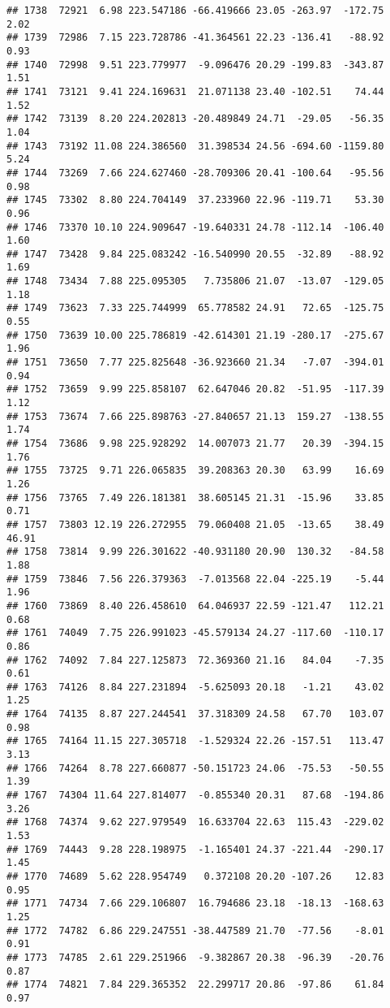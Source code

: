 \documentclass[]{article}
\begin{document}
\begin{verbatim}
## 1738  72921  6.98 223.547186 -66.419666 23.05 -263.97  -172.75  2.02
## 1739  72986  7.15 223.728786 -41.364561 22.23 -136.41   -88.92  0.93
## 1740  72998  9.51 223.779977  -9.096476 20.29 -199.83  -343.87  1.51
## 1741  73121  9.41 224.169631  21.071138 23.40 -102.51    74.44  1.52
## 1742  73139  8.20 224.202813 -20.489849 24.71  -29.05   -56.35  1.04
## 1743  73192 11.08 224.386560  31.398534 24.56 -694.60 -1159.80  5.24
## 1744  73269  7.66 224.627460 -28.709306 20.41 -100.64   -95.56  0.98
## 1745  73302  8.80 224.704149  37.233960 22.96 -119.71    53.30  0.96
## 1746  73370 10.10 224.909647 -19.640331 24.78 -112.14  -106.40  1.60
## 1747  73428  9.84 225.083242 -16.540990 20.55  -32.89   -88.92  1.69
## 1748  73434  7.88 225.095305   7.735806 21.07  -13.07  -129.05  1.18
## 1749  73623  7.33 225.744999  65.778582 24.91   72.65  -125.75  0.55
## 1750  73639 10.00 225.786819 -42.614301 21.19 -280.17  -275.67  1.96
## 1751  73650  7.77 225.825648 -36.923660 21.34   -7.07  -394.01  0.94
## 1752  73659  9.99 225.858107  62.647046 20.82  -51.95  -117.39  1.12
## 1753  73674  7.66 225.898763 -27.840657 21.13  159.27  -138.55  1.74
## 1754  73686  9.98 225.928292  14.007073 21.77   20.39  -394.15  1.76
## 1755  73725  9.71 226.065835  39.208363 20.30   63.99    16.69  1.26
## 1756  73765  7.49 226.181381  38.605145 21.31  -15.96    33.85  0.71
## 1757  73803 12.19 226.272955  79.060408 21.05  -13.65    38.49 46.91
## 1758  73814  9.99 226.301622 -40.931180 20.90  130.32   -84.58  1.88
## 1759  73846  7.56 226.379363  -7.013568 22.04 -225.19    -5.44  1.96
## 1760  73869  8.40 226.458610  64.046937 22.59 -121.47   112.21  0.68
## 1761  74049  7.75 226.991023 -45.579134 24.27 -117.60  -110.17  0.86
## 1762  74092  7.84 227.125873  72.369360 21.16   84.04    -7.35  0.61
## 1763  74126  8.84 227.231894  -5.625093 20.18   -1.21    43.02  1.25
## 1764  74135  8.87 227.244541  37.318309 24.58   67.70   103.07  0.98
## 1765  74164 11.15 227.305718  -1.529324 22.26 -157.51   113.47  3.13
## 1766  74264  8.78 227.660877 -50.151723 24.06  -75.53   -50.55  1.39
## 1767  74304 11.64 227.814077  -0.855340 20.31   87.68  -194.86  3.26
## 1768  74374  9.62 227.979549  16.633704 22.63  115.43  -229.02  1.53
## 1769  74443  9.28 228.198975  -1.165401 24.37 -221.44  -290.17  1.45
## 1770  74689  5.62 228.954749   0.372108 20.20 -107.26    12.83  0.95
## 1771  74734  7.66 229.106807  16.794686 23.18  -18.13  -168.63  1.25
## 1772  74782  6.86 229.247551 -38.447589 21.70  -77.56    -8.01  0.91
## 1773  74785  2.61 229.251966  -9.382867 20.38  -96.39   -20.76  0.87
## 1774  74821  7.84 229.365352  22.299717 20.86  -97.86    61.84  0.97

\end{verbatim}
\end{document}
